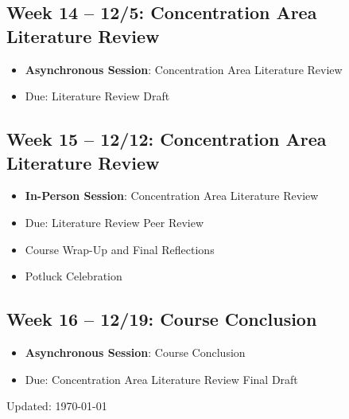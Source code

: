 \documentclass[12pt, letterpaper]{article}
\begin{document}
\subsection*{Week 14 -- 12/5: Concentration Area Literature Review}
\begin{itemize}
    \item \textbf{Asynchronous Session}: Concentration Area Literature Review
    \item Due: Literature Review Draft
\end{itemize}

\subsection*{Week 15 -- 12/12: Concentration Area Literature Review}
\begin{itemize}
    \item \textbf{In-Person Session}: Concentration Area Literature Review
    \item Due: Literature Review Peer Review
    \item Course Wrap-Up and Final Reflections
    \item Potluck Celebration
\end{itemize}

\subsection*{Week 16 -- 12/19: Course Conclusion}
\begin{itemize}
    \item \textbf{Asynchronous Session}: Course Conclusion
    \item Due: Concentration Area Literature Review Final Draft
\end{itemize}


            \singlespace
            
            

\begin{flushright}
Updated: \today
\end{flushright}

            
\end{document}

